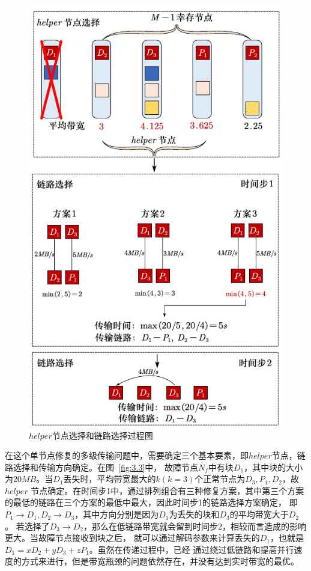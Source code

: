 \begin{figure}[htbp]
	\centering
	\includegraphics [scale=0.9]{figures/3.4.pdf}
	\caption{$helper$节点选择和链路选择过程图}
	\label{fig:3.4}
\end{figure}


在这个单节点修复的多级传输问题中，需要确定三个基本要素，即$helper$节点，链路选择和传输方向确定。在图~\ref{fig:3.3}中，
故障节点$N_f$中有块$D_1$，其中块的大小为$20MB$。当$D_1$丢失时，平均带宽最大的$k(k=3)$个正常节点为$D_3,P_1,D_2$，故$helper$
节点确定。在时间步1中，通过排列组合有三种修复方案，其中第三个方案的最低的链路在三个方案的最低中最大，因此时间步1的链路选择方案确定，
即$P_1\rightarrow D_1,D_2\rightarrow D_3$，其中方向分别是因为$D_1$为丢失的块和$D_3$的平均带宽大于$D_2$。
若选择了$D_3\rightarrow D_2$，那么在低链路带宽就会留到时间步2，相较而言造成的影响更大。当故障节点接收到块之后，
就可以通过解码参数来计算丢失的$D_1$，也就是$D_1=xD_2+yD_3+zP_1$。虽然在传递过程中，已经
通过绕过低链路和提高并行速度的方式来进行，但是带宽瓶颈的问题依然存在，并没有达到实时带宽的最优。

